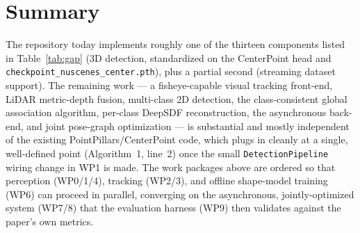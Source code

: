 \documentclass[11pt]{article}
\begin{document}
\section{Summary}

The repository today implements roughly one of the thirteen components listed in Table~\ref{tab:gap} (3D detection, standardized on the CenterPoint head and \texttt{checkpoint\_nuscenes\_center.pth}), plus a partial second (streaming dataset support). The remaining work --- a fisheye-capable visual tracking front-end, LiDAR metric-depth fusion, multi-class 2D detection, the class-consistent global association algorithm, per-class DeepSDF reconstruction, the asynchronous back-end, and joint pose-graph optimization --- is substantial and mostly independent of the existing PointPillars/CenterPoint code, which plugs in cleanly at a single, well-defined point (Algorithm~1, line~2) once the small \texttt{DetectionPipeline} wiring change in WP1 is made. The work packages above are ordered so that perception (WP0/1/4), tracking (WP2/3), and offline shape-model training (WP6) can proceed in parallel, converging on the asynchronous, jointly-optimized system (WP7/8) that the evaluation harness (WP9) then validates against the paper's own metrics.



\end{document}
